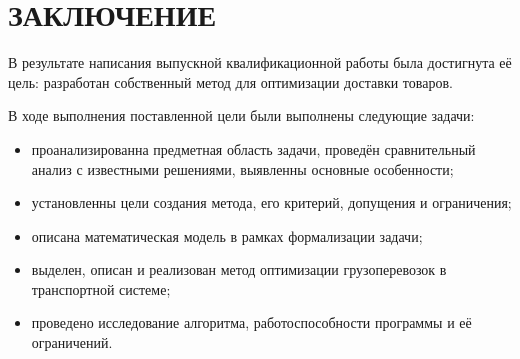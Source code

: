 \section*{ЗАКЛЮЧЕНИЕ}
	В результате написания выпускной квалификационной работы была достигнута её цель: разработан собственный метод для оптимизации доставки товаров.
	
	В ходе выполнения поставленной цели были выполнены следующие задачи:
	\begin{itemize}
		\item проанализированна предметная область задачи, проведён сравнительный анализ с известными решениями, выявленны основные особенности;
		\item установленны цели создания метода, его критерий, допущения и ограничения;
		\item описана математическая модель в рамках формализации задачи;
		\item выделен, описан и реализован метод оптимизации грузоперевозок в транспортной системе;
		\item проведено исследование алгоритма, работоспособности программы и её ограничений.
	\end{itemize}

\pagebreak
